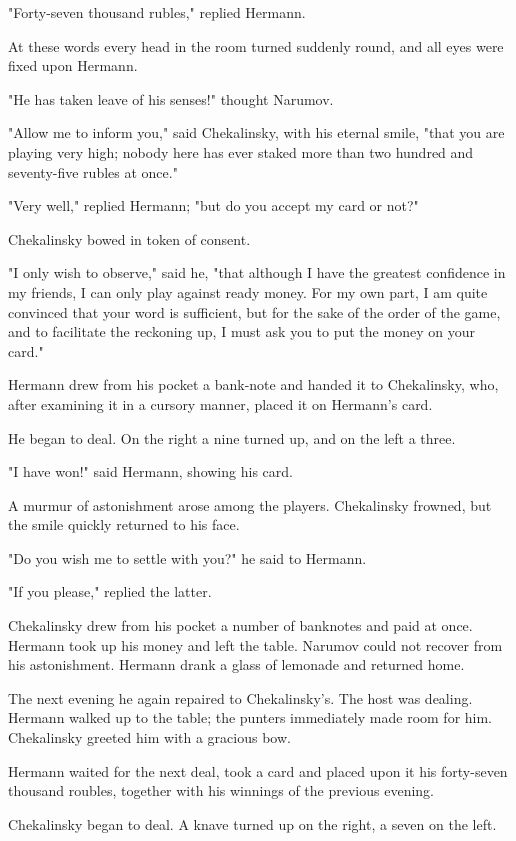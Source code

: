 "Forty-seven thousand rubles," replied Hermann.

At these words every head in the room turned suddenly round, and all
eyes were fixed upon Hermann.

"He has taken leave of his senses!" thought Narumov.

"Allow me to inform you," said Chekalinsky, with his eternal smile,
"that you are playing very high; nobody here has ever staked more than
two hundred and seventy-five rubles at once."

"Very well," replied Hermann; "but do you accept my card or not?"

Chekalinsky bowed in token of consent.

"I only wish to observe," said he, "that although I have the greatest
confidence in my friends, I can only play against ready money. For my
own part, I am quite convinced that your word is sufficient, but for
the sake of the order of the game, and to facilitate the reckoning up,
I must ask you to put the money on your card."

Hermann drew from his pocket a bank-note and handed it to Chekalinsky,
who, after examining it in a cursory manner, placed it on Hermann's
card.

He began to deal. On the right a nine turned up, and on the left a
three.

"I have won!" said Hermann, showing his card.

A murmur of astonishment arose among the players. Chekalinsky frowned,
but the smile quickly returned to his face.

"Do you wish me to settle with you?" he said to Hermann.

"If you please," replied the latter.

Chekalinsky drew from his pocket a number of banknotes and paid at
once. Hermann took up his money and left the table. Narumov could not
recover from his astonishment. Hermann drank a glass of lemonade and
returned home.

The next evening he again repaired to Chekalinsky's. The host was
dealing. Hermann walked up to the table; the punters immediately made
room for him. Chekalinsky greeted him with a gracious bow.

Hermann waited for the next deal, took a card and placed upon it his
forty-seven thousand roubles, together with his winnings of the
previous evening.

Chekalinsky began to deal. A knave turned up on the right, a seven on
the left.

